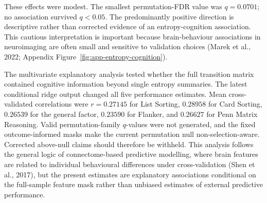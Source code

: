 \documentclass[12pt,a4paper]{report}
\newcommand{\compacttablestyle}{%
  \captionsetup{font=footnotesize,skip=2pt}%
  \small
  \setlength{\tabcolsep}{3pt}%
  \renewcommand{\arraystretch}{0.85}%
}
\begin{document}
These effects were modest. The smallest permutation-FDR value was $q=0.0701$; no association survived $q<0.05$. The predominantly positive direction is descriptive rather than corrected evidence of an entropy-cognition association. This cautious interpretation is important because brain-behaviour associations in neuroimaging are often small and sensitive to validation choices (Marek et al., 2022; Appendix Figure~\ref{fig:app-entropy-cognition}).

The multivariate explanatory analysis tested whether the full transition matrix contained cognitive information beyond single entropy summaries. The latest conditional ridge output changed all five performance estimates. Mean cross-validated correlations were $r=0.27145$ for List Sorting, $0.28958$ for Card Sorting, $0.26539$ for the general factor, $0.23590$ for Flanker, and $0.26627$ for Penn Matrix Reasoning. Valid permutation-family $q$-values were not generated, and the fixed outcome-informed masks make the current permutation null non-selection-aware. Corrected above-null claims should therefore be withheld. This analysis follows the general logic of connectome-based predictive modelling, where brain features are related to individual behavioural differences under cross-validation (Shen et al., 2017), but the present estimates are explanatory associations conditional on the full-sample feature mask rather than unbiased estimates of external predictive performance.


\end{document}
